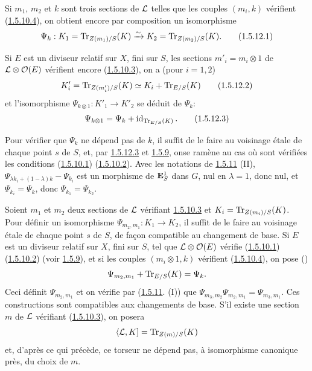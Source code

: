 \documentclass[10pt]{../fichiers-configuration-latex/smfart}
\begin{document}
Si $m_{1}$, $m_{2}$ et $k$ sont trois sections de ${\mathcal L}$ telles
que les couples $(m_{i},k)$ vérifient (\hyperref[XVIII.par1.5.10.4]{1.5.10.4}), on
obtient encore par composition un isomorphisme
\begin{equation*}
\Psi_{k}:K_{1}=\operatorname{Tr}_{Z(m_{1})/S}(K)\xrightarrow{\sim}
K_{2}=\operatorname{Tr}_{Z(m_{2})/S}(K){}.\tag{1.5.12.1}
\end{equation*}

Si $E$ est un diviseur relatif sur $X$, fini sur $S$, les sections
$m'_{i}=m_{i}\otimes 1$ de ${\mathcal L}\otimes {\mathcal O}(E)$ vérifient
encore (\hyperref[XVIII.par1.5.10.3]{1.5.10.3}), on a (pour $i=1,2$)
\begin{equation*}
K'_{i}=\operatorname{Tr}_{Z(m'_{i})/S}(K)\simeq K_{i}+\operatorname{Tr}_{E/S}(K)\tag{1.5.12.2}
\end{equation*}%
et l'isomorphisme $\Psi_{k\otimes 1}:K'_{1}\rightarrow K'_{2}$ se
déduit de $\Psi_{k}$:
\begin{equation*}
\Psi_{k\otimes 1}=\Psi_{k}+\operatorname{id}_{\operatorname{Tr}_{E/S}(K)}{}.\tag{1.5.12.3}
\end{equation*}

Pour vérifier que $\Psi_{k}$ ne dépend pas de $k$, il suffit de le
faire au voisinage étale de chaque point $s$ de $S$, et, par \hyperref[XVIII.eq1.5.12.3]{1.5.12.3}
et \hyperref[XVIII.lem1.5.9]{1.5.9}, on\pageoriginale se ramène au cas où sont
vérifiées les 
conditions (\hyperref[XVIII.par1.5.10.1]{1.5.10.1}) (\hyperref[XVIII.par1.5.10.2]{1.5.10.2}). Avec
les notations de \hyperref[XVIII.lem1.5.11]{1.5.11} (II), 
$\Psi_{\lambda k_{i}+(1-\lambda)k}-\Psi_{k_{i}}$ est un morphisme de
$\mathbf{E}^{1}_{S}$ dans $G$, nul en $\lambda =1$, donc nul, et
$\Psi_{k_{i}}=\Psi_{k}$, donc $\Psi_{k_{1}}=\Psi_{k_{2}}$.

Soient $m_{1}$ et $m_{2}$ deux sections de ${\mathcal L}$ vérifiant
\hyperref[XVIII.par1.5.10.3]{1.5.10.3} et $K_{i}=\operatorname{Tr}_{Z(m_{i})/S}(K)$. Pour définir
un isomorphisme 
$\Psi_{m_{2},m_{1}}:K_{1}\rightarrow K_{2}$, il suffit de le faire au
voisinage étale de chaque point $s$ de $S$, de façon compatible au
changement de base. Si $E$ est un diviseur relatif sur $X$, fini sur
$S$, tel que ${\mathcal L}\otimes {\mathcal O}(E)$ vérifie (\hyperref[XVIII.par1.5.10.1]{1.5.10.1})
(\hyperref[XVIII.par1.5.10.2]{1.5.10.2}) (voir \hyperref[XVIII.lem1.5.9]{1.5.9}), et si les
couples $(m_{i}\otimes 1,k)$ 
vérifient (\hyperref[XVIII.par1.5.10.4]{1.5.10.4}), on pose (\cf {})
$$
\Psi_{m_{2},m_{1}}+\operatorname{Tr}_{E/S}(K)=\Psi_{k}{}.
$$
Ceci définit $\Psi_{m_{2},m_{1}}$ et on vérifie par
(\hyperref[XVIII.lem1.5.11]{1.5.11}. (I)) que $\Psi_{m_{3},
  m_{2}}\Psi_{m_{2},m_{1}}=\Psi_{m_{3},m_{1}}$. Ces 
constructions sont compatibles aux changements de base. S'il existe
une section $m$ de ${\mathcal L}$ vérifiant (\hyperref[XVIII.par1.5.10.3]{1.5.10.3}), on posera
$$
\langle {\mathcal L},K]=\operatorname{Tr}_{Z(m)/S}(K)
$$
et, d'après ce qui précède, ce torseur ne dépend pas, à isomorphisme
canonique près, du choix de $m$.
\end{document}
